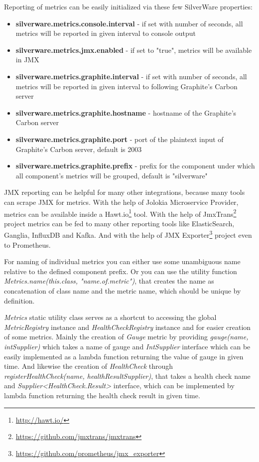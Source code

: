 \documentclass[12pt,oneside]{fithesis2}
\begin{document}
Reporting of metrics can be easily initialized via these few SilverWare properties:

\begin{itemize}
\item \textbf{silverware.metrics.console.interval} - if set with number of seconds, all metrics will be reported in given interval to console output
\item \textbf{silverware.metrics.jmx.enabled} - if set to "true", metrics will be available in JMX
\item \textbf{silverware.metrics.graphite.interval} - if set with number of seconds, all metrics will be reported in given interval to following Graphite's Carbon server
\item \textbf{silverware.metrics.graphite.hostname} - hostname of the Graphite's Carbon server
\item \textbf{silverware.metrics.graphite.port} - port of the plaintext input of Graphite's Carbon server, default is 2003
\item \textbf{silverware.metrics.graphite.prefix} - prefix for the component under which all component's metrics will be grouped, default is "silverware"
\end{itemize}

JMX reporting can be helpful for many other integrations, because many tools can scrape JMX for metrics. With the help of Jolokia Microservice Provider, metrics can be available inside a Hawt.io\footnote{\url{http://hawt.io/}} tool. With the help of JmxTrans\footnote{\url{https://github.com/jmxtrans/jmxtrans}} project metrics can be fed to many other reporting tools like ElasticSearch, Ganglia, InfluxDB and Kafka. And with the help of JMX Exporter\footnote{\url{https://github.com/prometheus/jmx_exporter}} project even to Prometheus.

For naming of individual metrics you can either use some unambiguous name relative to the defined component prefix. Or you can use the utility function \textit{Metrics.name(this.class, "name.of.metric")}, that creates the name as concatenation of class name and the metric name, which should be unique by definition.

\textit{Metrics} static utility class serves as a shortcut to accessing the global \textit{MetricRegistry} instance and \textit{HealthCheckRegistry} instance and for easier creation of some metrics. Mainly the creation of \textit{Gauge} metric by providing \textit{gauge(name, intSupplier)} which takes a name of gauge and \textit{IntSupplier} interface which can be easily implemented as a lambda function returning the value of gauge in given time. And likewise the creation of \textit{HealthCheck} through \textit{registerHealthCheck(name, healthResultSupplier)}, that takes a health check name and \textit{Supplier<HealthCheck.Result>} interface, which can be implemented by lambda function returning the health check result in given time.
\end{document}
